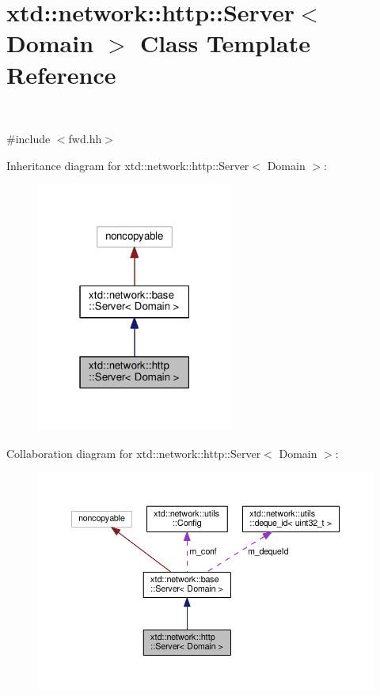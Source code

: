 \hypertarget{classxtd_1_1network_1_1http_1_1Server}{}\section{xtd\+:\+:network\+:\+:http\+:\+:Server$<$ Domain $>$ Class Template Reference}
\label{classxtd_1_1network_1_1http_1_1Server}


~\newline
~\newline
  




{\ttfamily \#include $<$fwd.\+hh$>$}



Inheritance diagram for xtd\+:\+:network\+:\+:http\+:\+:Server$<$ Domain $>$\+:
\nopagebreak
\begin{figure}[H]
\begin{center}
\leavevmode
\includegraphics[width=183pt]{classxtd_1_1network_1_1http_1_1Server__inherit__graph}
\end{center}
\end{figure}


Collaboration diagram for xtd\+:\+:network\+:\+:http\+:\+:Server$<$ Domain $>$\+:
\nopagebreak
\begin{figure}[H]
\begin{center}
\leavevmode
\includegraphics[width=350pt]{classxtd_1_1network_1_1http_1_1Server__coll__graph}
\end{center}
\end{figure}
